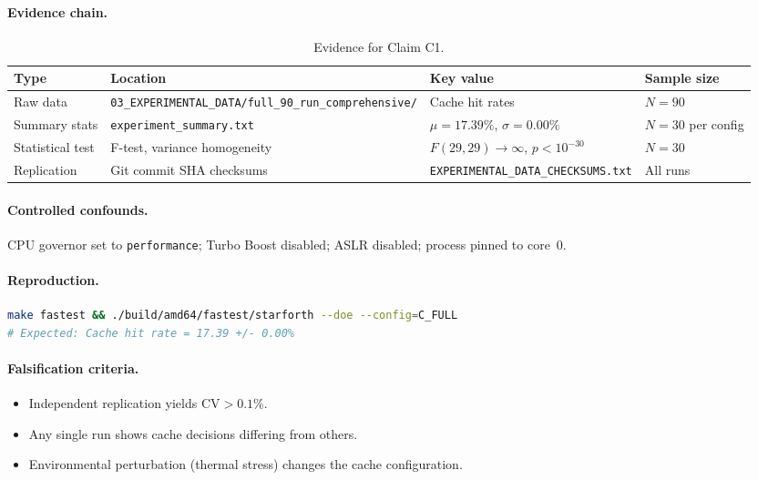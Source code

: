 \paragraph{Evidence chain.}
\begin{table}[h]
\centering
\caption{Evidence for Claim C1.}
\begin{tabular}{llll}
\toprule
\textbf{Type} & \textbf{Location} & \textbf{Key value} & \textbf{Sample size} \\
\midrule
Raw data & \texttt{03\_EXPERIMENTAL\_DATA/full\_90\_run\_comprehensive/} & Cache hit rates & $N = 90$ \\
Summary stats & \texttt{experiment\_summary.txt} & $\mu = 17.39\%$, $\sigma = 0.00\%$ & $N = 30$ per config \\
Statistical test & F-test, variance homogeneity & $F(29,29) \to \infty$, $p < 10^{-30}$ & $N = 30$ \\
Replication & Git commit SHA checksums & \texttt{EXPERIMENTAL\_DATA\_CHECKSUMS.txt} & All runs \\
\bottomrule
\end{tabular}
\end{table}

\paragraph{Controlled confounds.}
CPU governor set to \texttt{performance}; Turbo Boost disabled; ASLR
disabled; process pinned to core~0.

\paragraph{Reproduction.}
\begin{lstlisting}[language=bash]
make fastest && ./build/amd64/fastest/starforth --doe --config=C_FULL
# Expected: Cache hit rate = 17.39 +/- 0.00%
\end{lstlisting}

\paragraph{Falsification criteria.}
\begin{itemize}
  \item Independent replication yields $\text{CV} > 0.1\%$.
  \item Any single run shows cache decisions differing from others.
  \item Environmental perturbation (thermal stress) changes the cache configuration.
\end{itemize}

